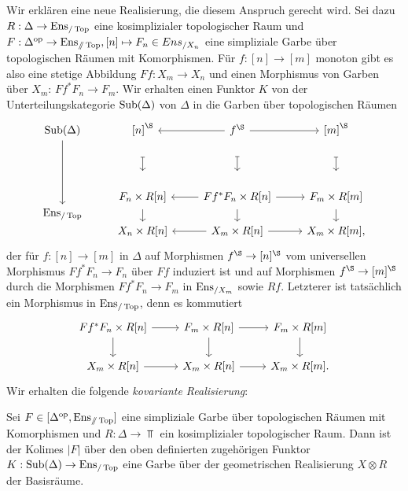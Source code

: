 Wir erklären eine neue Realisierung, die diesem Anspruch gerecht wird.
Sei dazu $R: \Delta \to \operatorname{Ens}_{/\operatorname{Top}}$ eine kosimplizialer
topologischer Raum und $F: \Delta^\mathrm{op} \to \operatorname{Ens}_{\mathbin{/\mkern-6mu/}\operatorname{Top}}, [n]
\mapsto F_n \in Ens_{/X_n}$ eine simpliziale Garbe über topologischen
Räumen mit Komorphismen. Für $f: [n] \to [m]$ monoton gibt es also
eine stetige Abbildung $Ff: X_m \to X_n$ und einen Morphismus von
Garben über $X_m$: $Ff^* F_n \to F_m$. Wir erhalten einen Funktor $K$
von der Unterteilungskategorie $\operatorname{Sub}(\Delta)$ von $\Delta$ in die
Garben über topologischen Räumen
\begin{equation} \label{dg:cov-real}
  \begin{tikzcd}
    \Sub(\Delta) \arrow{dd}
    & {[n]}^\S \dar[mapsto, shorten <= 3em, yshift=1.5em]
    & \lar f^\S \dar[mapsto, shorten <= 3em, yshift=1.5em] \rar
    & {[m]}^\S \dar[mapsto, shorten <= 3em, yshift=1.5em] \\[25]
    & F_n \times R[n]
    & \lar Ff^* F_n \times R[n] \rar
    & F_m \times R[m] \\[-2em]
    \Ens_{/\Top}
    & \dar[shorten <= -1em]
    & \dar[shorten <= -1em]
    & \dar[shorten <= -1em] \\[-2em]
    & X_n \times R[n]
    & \lar X_m \times R[n] \rar
    & X_m \times R[m],
  \end{tikzcd}
\end{equation}
der für $f: [n] \to [m]$ in $\Delta$ auf Morphismen $f^\S \to [n]^\S$
vom universellen Morphismus $Ff^* F_n \to F_n$ über $Ff$ induziert ist
und auf Morphismen $f^\S \to [m]^\S$ durch die Morphismen $Ff^* F_n
\to F_m$ in $\operatorname{Ens}_{/X_m}$ sowie $Rf$. Letzterer ist tatsächlich ein
Morphismus in $\operatorname{Ens}_{/\operatorname{Top}}$, denn es kommutiert
\[ \begin{tikzcd}
  Ff^* F_n \times R[n] \dar \rar
  & F_m \times R[n] \dar \rar
  & F_m \times R[m] \dar \\
  X_m \times R[n] \rar
  & X_m \times R[n] \rar
  & X_m \times R[m].
\end{tikzcd} \]
Wir erhalten die folgende \emph{kovariante Realisierung}:
\begin{prop} \label{real-enstop-cov}
  Sei $F \in [\Delta^\mathrm{op}, \operatorname{Ens}_{\mathbin{/\mkern-6mu/} \operatorname{Top}}]$ eine simpliziale Garbe
  über topologischen Räumen mit Komorphismen und $R: \Delta \to \Top$
  ein kosimplizialer topologischer Raum. Dann ist der Kolimes $|F|$
  über den oben definierten zugehörigen Funktor $K: \operatorname{Sub}(\Delta) \to
  \operatorname{Ens}_{/\operatorname{Top}}$ eine Garbe über der geometrischen Realisierung $X
  \otimes R$ der Basisräume.
\end{prop}
